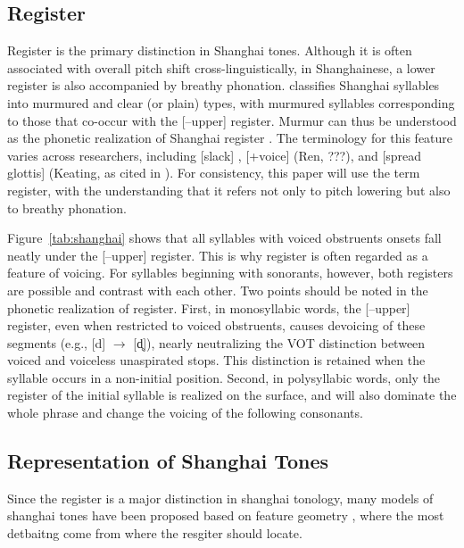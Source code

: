 \documentclass[11pt]{article}
\begin{document}

\subsection{Register}
Register is the primary distinction in Shanghai tones. Although it is often 
associated with overall pitch shift cross-linguistically, in Shanghainese, a 
lower register is also accompanied by breathy phonation. \citet{yip1980} 
classifies Shanghai syllables into murmured and clear (or plain) types, with 
murmured syllables corresponding to those that co-occur with the [–upper] 
register. Murmur can thus be 
understood as the phonetic realization of Shanghai register 
\citep{zhu1999shanghai}. The terminology for this feature varies across 
researchers, including [slack] \citep{duanmu1999metrical}, [+voice] (Ren, ???), 
and [spread glottis] (Keating, as cited in \citealt{yip1993tonal}). For 
consistency, this paper will use the term register, with the understanding that 
it refers not only to pitch lowering but also to breathy phonation.

Figure~\ref{tab:shanghai} shows that all syllables with voiced obstruents 
onsets fall neatly under the [–upper] register. This is why register is often 
regarded as a feature of voicing. For syllables beginning with sonorants, 
however, both registers are possible and contrast with each other. Two points 
should be noted in the phonetic realization of register. First, in monosyllabic 
words, the [–upper] register, even when restricted to voiced obstruents, causes 
devoicing of these segments (e.g., [d] $\rightarrow$ [d̥]), nearly neutralizing 
the VOT distinction between voiced and voiceless unaspirated stops. This 
distinction is retained when the syllable occurs in a non-initial position. 
Second, in polysyllabic words, only the register of the initial syllable is 
realized on the surface, and will also dominate the whole phrase and change the 
voicing of the following consonants.

\subsection{Representation of Shanghai Tones}
Since the register is a major distinction in shanghai tonology, many models of 
shanghai tones have been proposed based on feature geometry 
\citep{sagey1986feature}, where the most detbaitng come from where
the resgiter should locate. 
\end{document}
